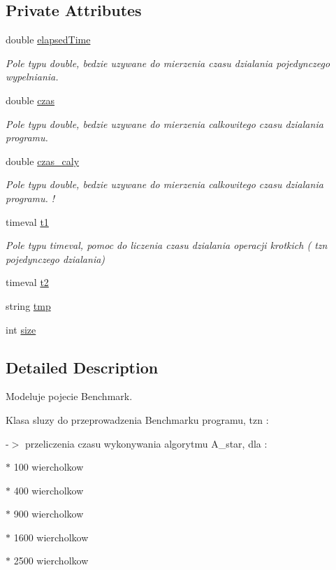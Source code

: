 \subsection*{Private Attributes}
\begin{DoxyCompactItemize}
\item 
double \hyperlink{classbenchmark_a90e6eda0144befd3f3bc1a881904fb57}{elapsed\-Time}
\begin{DoxyCompactList}\small\item\em Pole typu double, bedzie uzywane do mierzenia czasu dzialania pojedynczego wypelniania. \end{DoxyCompactList}\item 
double \hyperlink{classbenchmark_a563b747421276232836b7711b6881ec8}{czas}
\begin{DoxyCompactList}\small\item\em Pole typu double, bedzie uzywane do mierzenia calkowitego czasu dzialania programu. \end{DoxyCompactList}\item 
double \hyperlink{classbenchmark_af677300c0b0a0086f306a0a08a6172b9}{czas\-\_\-caly}
\begin{DoxyCompactList}\small\item\em Pole typu double, bedzie uzywane do mierzenia calkowitego czasu dzialania programu. ! \end{DoxyCompactList}\item 
timeval \hyperlink{classbenchmark_a7789217b36df3b3ae427ceaaa2694d0b}{t1}
\begin{DoxyCompactList}\small\item\em Pole typu timeval, pomoc do liczenia czasu dzialania operacji krotkich ( tzn pojedynczego dzialania) \end{DoxyCompactList}\item 
timeval \hyperlink{classbenchmark_aea9f22e585c0c5826329e48a97a99803}{t2}
\item 
string \hyperlink{classbenchmark_a3d82cef61c145b6dc3c27d99aa93c20f}{tmp}
\item 
int \hyperlink{classbenchmark_aa1ad33aa20b4497f764a6ff9a17bc83b}{size}
\end{DoxyCompactItemize}


\subsection{Detailed Description}
Modeluje pojecie Benchmark. 

Klasa sluzy do przeprowadzenia Benchmarku programu, tzn \-: \par
-\/$>$ przeliczenia czasu wykonywania algorytmu A\-\_\-star, dla \-: \par
 $\ast$ 100 wiercholkow \par
 $\ast$ 400 wiercholkow \par
 $\ast$ 900 wiercholkow \par
 $\ast$ 1600 wiercholkow \par
 $\ast$ 2500 wiercholkow 

